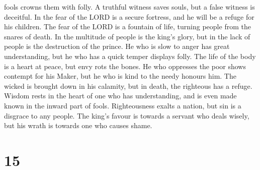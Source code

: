 fools crowns them with folly.  A truthful witness saves
souls, but a false witness is deceitful.  In the fear of
the LORD is a secure fortress, and he will be a refuge for his children.
 The fear of the LORD is a fountain of life, turning
people from the snares of death.  In the multitude of
people is the king's glory, but in the lack of people is the destruction
of the prince.  He who is slow to anger has great
understanding, but he who has a quick temper displays folly.
 The life of the body is a heart at peace, but envy rots
the bones.  He who oppresses the poor shows contempt for
his Maker, but he who is kind to the needy honours him. 
The wicked is brought down in his calamity, but in death, the righteous
has a refuge.  Wisdom rests in the heart of one who has
understanding, and is even made known in the inward part of fools.
 Righteousness exalts a nation, but sin is a disgrace to
any people.  The king's favour is towards a servant who
deals wisely, but his wrath is towards one who causes shame.

\hypertarget{section-14}{%
\section{15}\label{section-14}}

